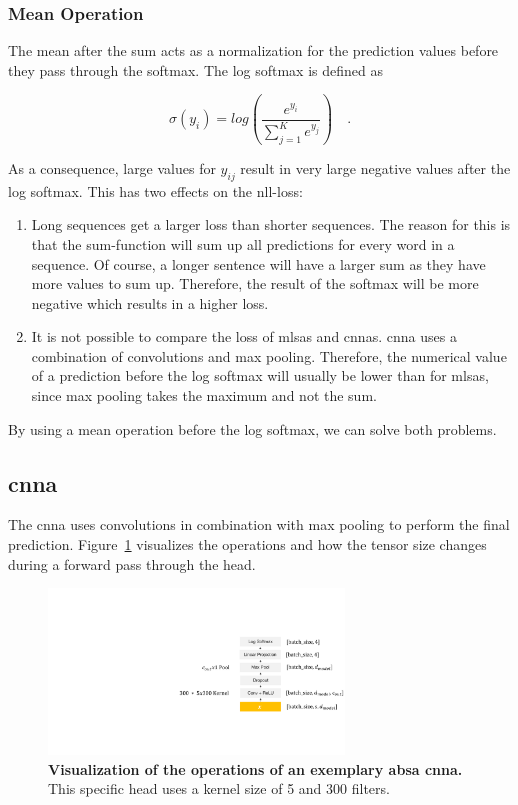 \subsubsection*{Mean Operation}

The mean after the sum acts as a normalization for the prediction values before they pass through the softmax. The log softmax is defined as 

\begin{equation}
    \sigma(y_i)=log(\frac{e^{y_i}}{\sum_{j=1}^{K}e^{y_j}})\quad .
\end{equation}

As a consequence, large values for $y_{ij}$ result in very large negative values after the log softmax. This has two effects on the \gls{nll}-loss:

\begin{enumerate}
    \item Long sequences get a larger loss than shorter sequences. The reason for this is that the sum-function will sum up all predictions for every word in a sequence. Of course, a longer sentence will have a larger sum as they have more values to sum up. Therefore, the result of the softmax will be more negative which results in a higher loss.
    \item It is not possible to compare the loss of \glspl{mlsa} and \glspl{cnna}. \gls{cnna} uses a combination of convolutions and max pooling. Therefore, the numerical value of a prediction before the log softmax will usually be lower than for \glspl{mlsa}, since max pooling takes the maximum and not the sum.
\end{enumerate}

By using a mean operation before the log softmax, we can solve both problems.

\subsection{\acrfull{cnna}}
The \acrfull{cnna} uses convolutions in combination with max pooling to perform the final prediction. Figure~\ref{fig:04_ch1} visualizes the operations and how the tensor size changes during a forward pass through the head. 
\medskip
\begin{figure}[htp]
    \centering
    \includegraphics[width=0.7\textwidth]{figures/04_method/04_ch}
    \caption{\textbf{Visualization of the operations of an exemplary \gls{absa} \acrfull{cnna}.} This specific head uses a kernel size of 5 and 300 filters.}
    \label{fig:04_ch1}
\end{figure}

